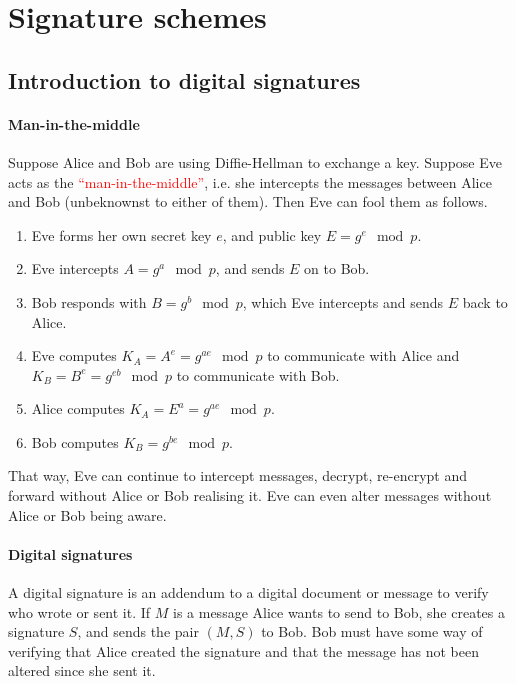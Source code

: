 \documentclass[a4paper, 11pt, openany]{book}
\numberwithin{equation}{section}
\theoremstyle{plain}
\theoremstyle{definition}
\newcommand{\Important}[1]{\textcolor{red}{#1}}
\begin{document}
\section{Signature schemes}
\label{sec:18}

\subsection{Introduction to digital signatures}

\paragraph{Man-in-the-middle}

Suppose Alice and Bob are using Diffie-Hellman to exchange a key. Suppose Eve acts as the \Important{``man-in-the-middle''}, i.e. she intercepts the messages between Alice and Bob (unbeknownst to either of them). Then Eve can fool them as follows.
\begin{enumerate}
    \item Eve forms her own secret key $e$, and public key $E = g^e \mod p$.

    \item Eve intercepts $A = g^a \mod p$, and sends $E$ on to Bob.

    \item Bob responds with $B = g^b \mod p$, which Eve intercepts and sends $E$ back to Alice.

    \item Eve computes $K_A = A^e = g^{ae} \mod p$ to communicate with Alice and $K_B = B^e = g^{eb} \mod p$ to communicate with Bob.

    \item Alice computes $K_A = E^a = g^{ae} \mod p$.

    \item Bob computes $K_B = g^{be} \mod p$.
\end{enumerate}
That way, Eve can continue to intercept messages, decrypt, re-encrypt and forward without Alice or Bob realising it. Eve can even alter messages without Alice or Bob being aware.



\paragraph{Digital signatures}

A digital signature is an addendum to a digital document or message to verify who wrote or sent it. If $M$ is a message Alice wants to send to Bob, she creates a signature $S$, and sends the pair $(M,S)$ to Bob. Bob must have some way of verifying that Alice created the signature and that the message has not been altered since she sent it.
\end{document}
